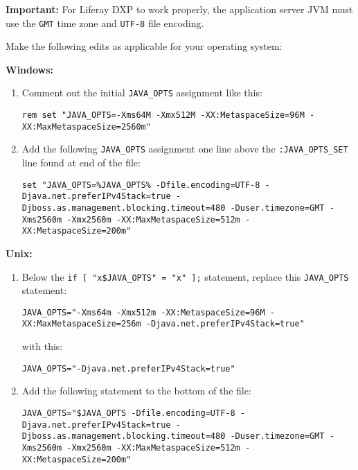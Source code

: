 \noindent\hrulefill

\textbf{Important:} For Liferay DXP to work properly, the application
server JVM must use the \texttt{GMT} time zone and \texttt{UTF-8} file
encoding.

\noindent\hrulefill

Make the following edits as applicable for your operating system:

\textbf{Windows:}

\begin{enumerate}
\def\labelenumi{\arabic{enumi}.}
\item
  Comment out the initial \texttt{JAVA\_OPTS} assignment like this:

\begin{verbatim}
rem set "JAVA_OPTS=-Xms64M -Xmx512M -XX:MetaspaceSize=96M -XX:MaxMetaspaceSize=2560m"
\end{verbatim}
\item
  Add the following \texttt{JAVA\_OPTS} assignment one line above the
  \texttt{:JAVA\_OPTS\_SET} line found at end of the file:

\begin{verbatim}
set "JAVA_OPTS=%JAVA_OPTS% -Dfile.encoding=UTF-8 -Djava.net.preferIPv4Stack=true -Djboss.as.management.blocking.timeout=480 -Duser.timezone=GMT -Xms2560m -Xmx2560m -XX:MaxMetaspaceSize=512m -XX:MetaspaceSize=200m"
\end{verbatim}
\end{enumerate}

\textbf{Unix:}

\begin{enumerate}
\def\labelenumi{\arabic{enumi}.}
\item
  Below the \texttt{if\ {[}\ "x\$JAVA\_OPTS"\ =\ "x"\ {]};} statement,
  replace this \texttt{JAVA\_OPTS} statement:

\begin{verbatim}
JAVA_OPTS="-Xms64m -Xmx512m -XX:MetaspaceSize=96M -XX:MaxMetaspaceSize=256m -Djava.net.preferIPv4Stack=true"
\end{verbatim}

  with this:

\begin{verbatim}
JAVA_OPTS="-Djava.net.preferIPv4Stack=true"
\end{verbatim}
\item
  Add the following statement to the bottom of the file:

\begin{verbatim}
JAVA_OPTS="$JAVA_OPTS -Dfile.encoding=UTF-8 -Djava.net.preferIPv4Stack=true -Djboss.as.management.blocking.timeout=480 -Duser.timezone=GMT -Xms2560m -Xmx2560m -XX:MaxMetaspaceSize=512m -XX:MetaspaceSize=200m"
\end{verbatim}
\end{enumerate}

